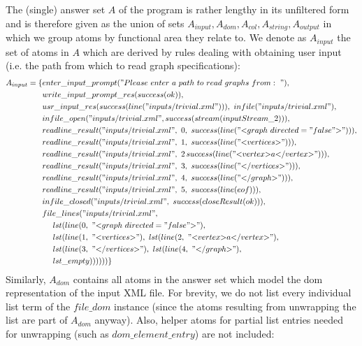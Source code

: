 \begin{example}
The (single) answer set $A$ of the program is rather lengthy in its unfiltered form and is therefore given as the union of sets $A_{input},A_{dom},A_{col},A_{string},A_{output}$ in which we group atoms by functional area they relate to.
We denote as $A_{input}$ the set of atoms in $A$ which are derived by rules dealing with obtaining user input (i.e. the path from which to read graph specifications):
\begin{align*}
    A_{input} = \{&enter\_input\_prompt("Please\ enter\ a\ path\ to\ read\ graphs\ from:\ "),\\
                  &write\_input\_prompt\_res(success(ok)),\\
                  &usr\_input\_res(success(line("inputs/trivial.xml"))),\ infile("inputs/trivial.xml"),\\
                  &infile\_open("inputs/trivial.xml", success(stream(inputStream\_2))),\\
                  &readline\_result("inputs/trivial.xml",\ 0,\ success(line("{<}graph\ directed="false"{>}"))),\\
                  &readline\_result("inputs/trivial.xml",\ 1,\ success(line("    {<}vertices{>}"))),\\
                  &readline\_result("inputs/trivial.xml",\ 2\, success(line("        {<}vertex{>}a{<}/vertex{>}"))),\\
                  &readline\_result("inputs/trivial.xml",\ 3,\ success(line(" {<}/vertices{>}"))),\\
                  &readline\_result("inputs/trivial.xml",\ 4,\ success(line("{<}/graph{>}"))),\\
                  &readline\_result("inputs/trivial.xml",\ 5,\ success(line(eof))),\\
                  &infile\_closed("inputs/trivial.xml",\ success(closeResult(ok))),\\
                  &file\_lines("inputs/trivial.xml",\\
                  &~~~~lst(line(0,\ "{<}graph\ directed="false"{>}"),\\
                  &~~~~lst(line(1,\ "    {<}vertices{>}"),\ lst(line(2,\ "        {<}vertex{>}a{<}/vertex{>}"),\\
                  &~~~~lst(line(3,\ "       {<}/vertices{>}"),\ lst(line(4,\ "{<}/graph{>}"),\\
                  &~~~~lst\_empty))))))\}
\end{align*} 
Similarly, $A_{dom}$ contains all atoms in the answer set which model the \gls{dom} representation of the input XML file. For brevity, we do not list every individual list term of the $file\_dom$ instance (since the atoms resulting from unwrapping the list are part of $A_{dom}$ anyway). Also, helper atoms for partial list entries needed for unwrapping (such as $dom\_element\_entry$) are not included:

\end{example}
